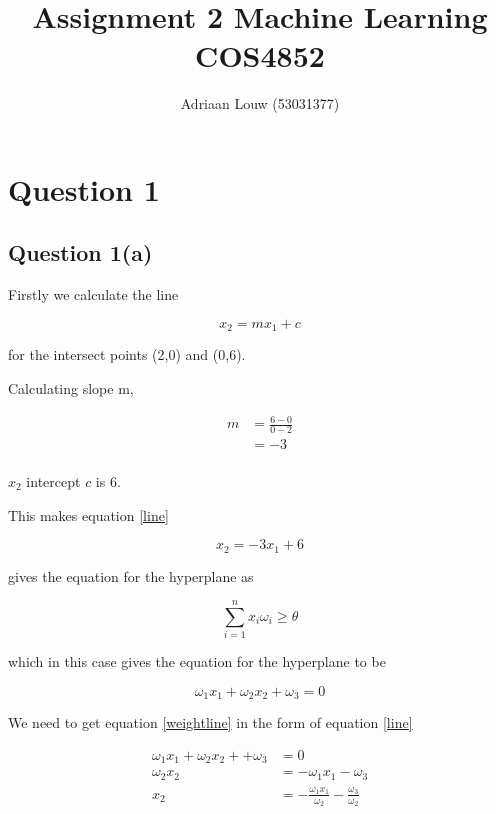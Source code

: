 \documentclass[10pt,a4paper]{article}
\title{Assignment 2 Machine Learning COS4852}
\author{ Adriaan Louw (53031377) }
\begin{document}
\maketitle

\tableofcontents

\section{Question 1}
\subsection{Question 1(a)}

Firstly we calculate the line 

\begin{equation}
\label{line}
 x_2 = mx_1 + c
\end{equation}

for the intersect points (2,0) and (0,6).

Calculating slope m,

\begin{equation}
\begin{split}
m &= \frac{6-0}{0-2} \\
  &= -3\\
\end{split}
\end{equation}

$x_2$ intercept $c$ is 6.

This makes equation \ref{line}

\begin{equation}
\label{pop}
x_2 = -3x_1 + 6
\end{equation}

\cite{nils} gives the equation for the hyperplane as

\begin{equation}
\sum_{i=1}^n x_i\omega_i \geq \theta
\end{equation}

which in this case gives the equation for the hyperplane to be

\begin{equation}
\label{weightline}
\omega_1x_1 + \omega_2x_2 +\omega_3 = 0
\end{equation}

We need to get equation \ref{weightline} in the form of equation \ref{line}

\begin{equation}
\begin{split}
\label{simp}
\omega_1x_1 + \omega_2x_2 + +\omega_3 &= 0\\
\omega_2x_2 &= -\omega_1x_1 - \omega_3\\ 
x_2 &= -\frac{\omega_1x_1}{\omega_2} - \frac{\omega_3}{\omega_2} \\ 
\end{split}
\end{equation}
\end{document}
